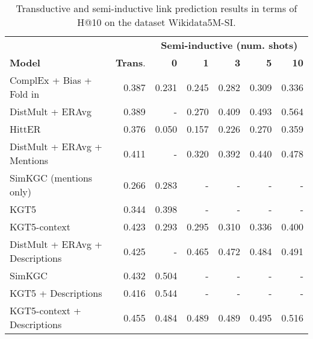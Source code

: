 \documentclass[11pt]{article}
\renewcommand\:{\colon} \newcommand{\sset}[1]{\left\{\,#1\,\right\}} \newcommand{\ssets}[1]{\left\{#1\right\}} \newcommand{\ssetn}[1]{\{\,#1\,\}}
\begin{document}
\begin{table*}
  \centering
  \begin{tabular}{lrrrrrr}
    \toprule
    & & \multicolumn{5}{c}{\textbf{Semi-inductive (num. shots)}}\\
    \cmidrule{3-7}
    \textbf{Model} & \textbf{Trans}. & \textbf{0} & \textbf{1} & \textbf{3} & \textbf{5} & \textbf{10} \\
    \midrule
    ComplEx + Bias + Fold in~\cite{jambor2021exploring} & 0.387 & 0.231 & 0.245 & 0.282 & 0.309 & 0.336 \\ DistMult + ERAvg~\cite{albooyeh2020out} & 0.389 & - & 0.270 & 0.409 & 0.493 & 0.564 \\ HittER~\cite{chen2021hitter} & 0.376 & 0.050 & 0.157 & 0.226 & 0.270 & 0.359 \\ \midrule
    DistMult + ERAvg + Mentions & 0.411 & - & 0.320 & 0.392 & 0.440 & 0.478 \\ SimKGC (mentions only) & 0.266 & 0.283 & - & - & - & -\\
    KGT5~\cite{saxena2022sequence} & 0.344 & 0.398 & - & - & - & -\\ KGT5-context~\cite{kochsiek2023friendly} & 0.423 & 0.293 & 0.295 & 0.310 & 0.336 & 0.400  \\ \midrule
    DistMult + ERAvg + Descriptions & 0.425 & - & 0.465 & 0.472 & 0.484 & 0.491 \\ SimKGC~\cite{wang2022simkgc} & 0.432 & 0.504 & - & - & - & -\\
    KGT5 + Descriptions & 0.416 & 0.544 & - & - & - & - \\ KGT5-context + Descriptions & 0.455 & 0.484 & 0.489 & 0.489 & 0.495 & 0.516 \\ \bottomrule
  \end{tabular}
  \caption{Transductive and semi-inductive link prediction results in terms of H@10 on the dataset Wikidata5M-SI.}
  \label{tab:si_results_h10}
\end{table*}
\end{document}
